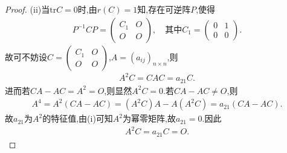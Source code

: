 \documentclass[../../main.tex]{subfiles}%
\begin{document}
\begin{proof}
(ii)当$\mathrm{tr}C=0$时,由$r(C)=1$知,存在可逆阵$P$,使得
\begin{align*}
P^{-1}CP=\begin{pmatrix}
C_1&O\\
O&O
\end{pmatrix},\quad 其中C_1=\begin{pmatrix}
0&1\\
0&0
\end{pmatrix}.
\end{align*}
故可不妨设$C=\begin{pmatrix}
C_1&O\\
O&O
\end{pmatrix}$,$A=(a_{ij})_{n\times n}$,则
\begin{align*}
A^2C=CAC=a_{21}C.
\end{align*}
进而若$CA-AC=A^2=O$,则显然$A^2C=0$.若$CA-AC\ne O$,则
\begin{align*}
A^4=A^2(CA-AC)=(A^2C)A-A(A^2C)=a_{21}(CA-AC).
\end{align*}
故$a_{21}$为$A^2$的特征值,由(i)可知$A^2$为幂零矩阵,故$a_{21}=0$.因此
\begin{align*}
A^2C=a_{21}C=O.
\end{align*}
\end{proof}
\end{document}
